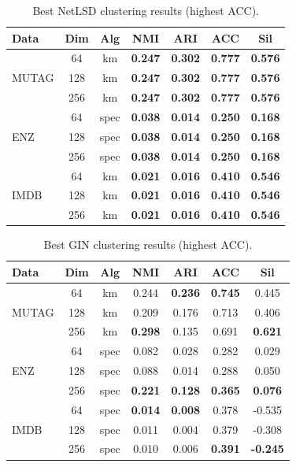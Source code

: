 \begin{table}
\centering
\scriptsize
\setlength{\tabcolsep}{4pt}
\begin{tabular}{l c c c c c c}
\toprule
\textbf{Data} & \textbf{Dim} & \textbf{Alg} & \textbf{NMI} & \textbf{ARI} & \textbf{ACC} & \textbf{Sil} \\
\midrule
 & 64  & km & \textbf{0.247} & \textbf{0.302} & \textbf{0.777} & \textbf{0.576} \\
MUTAG        & 128 & km & \textbf{0.247} & \textbf{0.302} & \textbf{0.777} & \textbf{0.576} \\
       & 256 & km & \textbf{0.247} & \textbf{0.302} & \textbf{0.777} & \textbf{0.576} \\
\midrule
    & 64  & spec & \textbf{0.038} & \textbf{0.014} & \textbf{0.250} & \textbf{0.168} \\
ENZ       & 128 & spec & \textbf{0.038} & \textbf{0.014} & \textbf{0.250} & \textbf{0.168} \\
       & 256 & spec & \textbf{0.038} & \textbf{0.014} & \textbf{0.250} & \textbf{0.168} \\
\midrule
   & 64  & km & \textbf{0.021} & \textbf{0.016} & \textbf{0.410} & \textbf{0.546} \\
IMDB       & 128 & km & \textbf{0.021} & \textbf{0.016} & \textbf{0.410} & \textbf{0.546} \\
       & 256 & km & \textbf{0.021} & \textbf{0.016} & \textbf{0.410} & \textbf{0.546} \\
\bottomrule
\end{tabular}
\caption{Best NetLSD clustering results (highest ACC).}
\label{tab:netlsd_cluster_best}
\end{table}



\begin{table}
\centering
\scriptsize
\setlength{\tabcolsep}{4pt}
\begin{tabular}{l c c c c c c}
\toprule
\textbf{Data} & \textbf{Dim} & \textbf{Alg} & \textbf{NMI} & \textbf{ARI} & \textbf{ACC} & \textbf{Sil} \\
\midrule
       & 64  & km   & 0.244 & \textbf{0.236} & \textbf{0.745} & 0.445 \\
    MUTAG   & 128 & km   & 0.209 & 0.176 & 0.713 & 0.406 \\
       & 256 & km   & \textbf{0.298} & 0.135 & 0.691 & \textbf{0.621} \\
\midrule
    & 64  & spec & 0.082 & 0.028 & 0.282 & 0.029 \\
ENZ       & 128 & spec & 0.088 & 0.014 & 0.288 & 0.050 \\
       & 256 & spec & \textbf{0.221} & \textbf{0.128} & \textbf{0.365} & \textbf{0.076} \\
\midrule
   & 64  & spec & \textbf{0.014} & \textbf{0.008} & 0.378 & -0.535 \\
IMDB       & 128 & spec & 0.011 & 0.004 & 0.379 & -0.308 \\
       & 256 & spec & 0.010 & 0.006 & \textbf{0.391} & \textbf{-0.245} \\
\bottomrule
\end{tabular}
\caption{Best GIN clustering results (highest ACC).}
\label{tab:gin_cluster_best}
\end{table}


